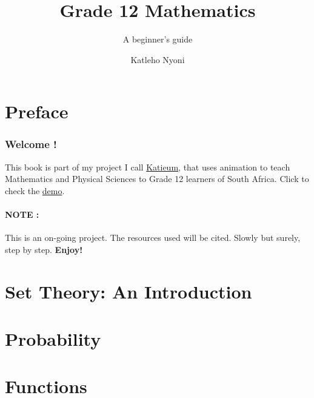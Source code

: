 \documentclass[
  letterpaper,
  DIV=11,
  numbers=noendperiod]{scrreprt}
\title{Grade 12 Mathematics}
\subtitle{A beginner's guide}
\author{Katleho Nyoni}
\date{}
\renewcommand*\contentsname{Table of contents}
\newcommand\contentsname{Table of contents}
\begin{document}
\maketitle

\renewcommand*\contentsname{Table of contents}
{
\hypersetup{linkcolor=}
\setcounter{tocdepth}{2}
\tableofcontents
}


\chapter*{Preface}\label{preface}


\subsection*{Welcome !}\label{welcome}

This book is part of my project I call
\href{https://github.com/Katleho-Nyoni/Grade_12-Visual}{Katieum}, that
uses animation to teach Mathematics and Physical Sciences to Grade 12
learners of South Africa. Click to check the
\href{https://www.youtube.com/watch?v=XwBtjpcyG-8}{demo}.

\subsubsection*{NOTE :}\label{note}

This is an on-going project. The resources used will be cited. Slowly
but surely, step by step. \textbf{Enjoy!}


\chapter{Set Theory: An Introduction}\label{set-theory-an-introduction}


\chapter{Probability}\label{probability}


\chapter{Functions}\label{functions}
\end{document}
